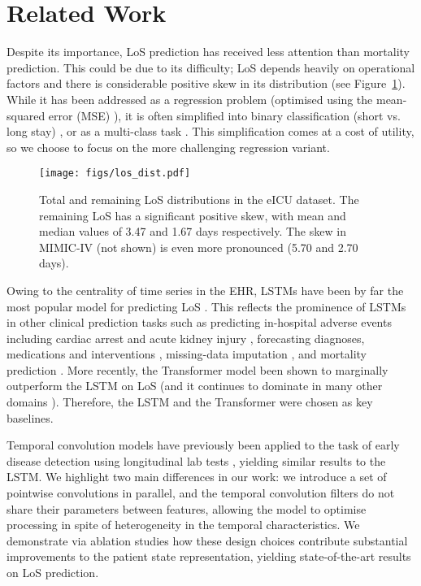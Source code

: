 \documentclass[sigconf]{acmart}
\begin{document}
\section{Related Work}
Despite its importance, LoS prediction has received less attention than mortality prediction. This could be due to its difficulty; LoS depends heavily on operational factors and there is considerable positive skew in its distribution (see Figure~\ref{fig:los_dist}). While it has been addressed as a regression problem (optimised using the mean-squared error (MSE) \citep{purushotham,sheikhalishahi2019benchmarking}), it is often simplified into binary classification (short vs. long stay) \citep{Gong2017PredictingCO,DBLP:journals/corr/abs-1811-12583,Rajkomar2018ScalableAA}, or as a multi-class task \citep{harutyunyan}. This simplification comes at a cost of utility, so we choose to focus on the more challenging regression variant.


\begin{figure}
  \centering
  \texttt{[image: figs/los\_dist.pdf]}
  \caption{Total and remaining LoS distributions in the eICU dataset. The remaining LoS has a significant positive skew, with mean and median values of 3.47 and 1.67 days respectively. The skew in MIMIC-IV (not shown) is even more pronounced (5.70 and 2.70 days).}
\label{fig:los_dist}
\end{figure}

Owing to the centrality of time series in the EHR, LSTMs have been by far the most popular model for predicting LoS \citep{harutyunyan,sheikhalishahi2019benchmarking,Rajkomar2018ScalableAA}. This reflects the prominence of LSTMs in other clinical prediction tasks such as predicting in-hospital adverse events including cardiac arrest \citep{Tonekaboni2018PredictionOC} and acute kidney injury \citep{Tomaev2019ACA}, forecasting diagnoses,  medications and interventions \citep{Choi2015DoctorAP,Lipton2015LearningTD,Suresh2017ClinicalIP}, missing-data imputation \citep{Cao2018BRITSBR}, and mortality prediction \citep{Che2018,harutyunyan,Shickel2019DeepSOFAAC}. More recently, the Transformer model \citep{46201} been shown to marginally outperform the LSTM on LoS \citep{2304ed73e858419398e3ee1508af5825} (and it continues to dominate in many other domains \citep{Mousavi2020}). Therefore, the LSTM and the Transformer were chosen as key baselines. 

Temporal convolution models have previously been applied to the task of early disease detection using longitudinal
lab tests \citep{pmlr-v85-oh18a, DBLP:journals/corr/RazavianS15, sontag}, yielding similar results to the LSTM. We highlight two main differences in our work: we introduce a set of pointwise convolutions in parallel, and the temporal convolution filters do not share their parameters between features, allowing the model to optimise processing in spite of heterogeneity in the temporal characteristics. We demonstrate via ablation studies how these design choices contribute substantial improvements to the patient state representation, yielding state-of-the-art results on LoS prediction.
\end{document}
